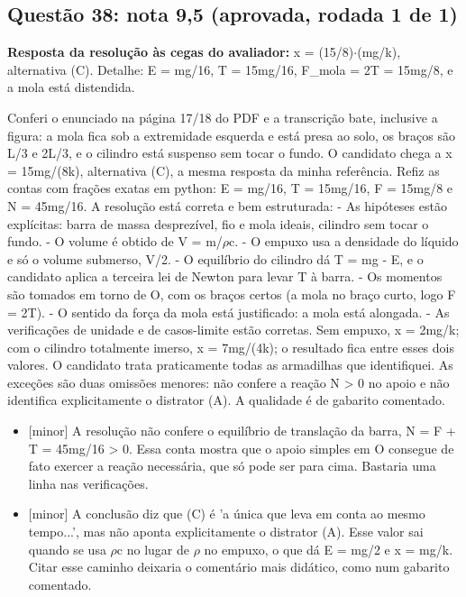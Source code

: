 \documentclass{article}%
\begin{document}
\subsection*{Questão 38: nota 9,5 (aprovada, rodada 1 de 1)}%
\textbf{Resposta da resolução às cegas do avaliador:} x = (15/8)$\cdot$(mg/k), alternativa (C). Detalhe: E = mg/16, T = 15mg/16, F\_mola = 2T = 15mg/8, e a mola está distendida.\par %
Conferi o enunciado na página 17/18 do PDF e a transcrição bate, inclusive a figura: a mola fica sob a extremidade esquerda e está presa ao solo, os braços são L/3 e 2L/3, e o cilindro está suspenso sem tocar o fundo. O candidato chega a x = 15mg/(8k), alternativa (C), a mesma resposta da minha referência. Refiz as contas com frações exatas em python: E = mg/16, T = 15mg/16, F = 15mg/8 e N = 45mg/16.\newline%
\newline%
A resolução está correta e bem estruturada:\newline%
{-} As hipóteses estão explícitas: barra de massa desprezível, fio e mola ideais, cilindro sem tocar o fundo.\newline%
{-} O volume é obtido de V = m/$\rho$c.\newline%
{-} O empuxo usa a densidade do líquido e só o volume submerso, V/2.\newline%
{-} O equilíbrio do cilindro dá T = mg - E, e o candidato aplica a terceira lei de Newton para levar T à barra.\newline%
{-} Os momentos são tomados em torno de O, com os braços certos (a mola no braço curto, logo F = 2T).\newline%
{-} O sentido da força da mola está justificado: a mola está alongada.\newline%
{-} As verificações de unidade e de casos{-}limite estão corretas. Sem empuxo, x = 2mg/k; com o cilindro totalmente imerso, x = 7mg/(4k); o resultado fica entre esses dois valores.\newline%
\newline%
O candidato trata praticamente todas as armadilhas que identifiquei. As exceções são duas omissões menores: não confere a reação N > 0 no apoio e não identifica explicitamente o distrator (A). A qualidade é de gabarito comentado.%
\begin{itemize}%
\item%
{[}minor{]} A resolução não confere o equilíbrio de translação da barra, N = F + T = 45mg/16 > 0. Essa conta mostra que o apoio simples em O consegue de fato exercer a reação necessária, que só pode ser para cima. Bastaria uma linha nas verificações.%
\item%
{[}minor{]} A conclusão diz que (C) é 'a única que leva em conta ao mesmo tempo...', mas não aponta explicitamente o distrator (A). Esse valor sai quando se usa $\rho$c no lugar de $\rho$ no empuxo, o que dá E = mg/2 e x = mg/k. Citar esse caminho deixaria o comentário mais didático, como num gabarito comentado.%
\end{itemize}%
\end{document}
